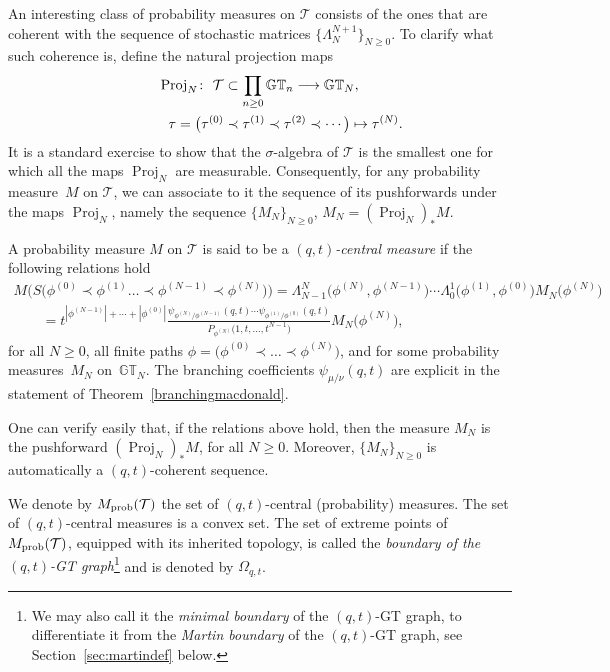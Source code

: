 \documentclass[pdftex]{sigma}
\numberwithin{equation}{section}
\newcommand{\GT}{\mathbb{GT}}
\newcommand{\Tau}{\mathcal{T}}
\begin{document}
An interesting class of probability measures on $\Tau$ consists of the ones that are coherent with the sequence of stochastic matrices $\big\{\Lambda^{N+1}_N\big\}_{N\geq 0}$. To clarify what such coherence is, def\/ine the natural projection maps
\begin{gather*}
\operatorname{Proj}_N\colon \ \Tau \subset \prod_{n\geq 0}{\GT_n} \longrightarrow \GT_N,\\
\hphantom{\operatorname{Proj}_N\colon}{} \ \tau = \big(\tau^{(0)} \prec \tau^{(1)} \prec \tau^{(2)} \prec \cdots\big) \mapsto \tau^{(N)}.
\end{gather*}
It is a standard exercise to show that the $\sigma$-algebra of $\Tau$ is the smallest one for which all the maps $\operatorname{Proj}_N$ are measurable. Consequently, for any probability measure~$M$ on $\Tau$, we can associate to it the sequence of its pushforwards under the maps $\operatorname{Proj}_N$, namely the sequence $\{M_N\}_{N\geq 0}$, $M_N = (\operatorname{Proj}_N )_*M$.

\begin{df}\label{def:qtcentral}
A probability measure $M$ on $\Tau$ is said to be a \textit{$(q, t)$-central measure} if the following relations hold
\begin{gather*}
M\big( S\big(\phi^{(0)} \prec \phi^{(1)}\dots \prec \phi^{(N-1)} \prec \phi^{(N)}\big) \big) =
\Lambda^{N}_{N-1}\big(\phi^{(N)}, \phi^{(N-1)}\big) \cdots \Lambda^{1}_0\big(\phi^{(1)}, \phi^{(0)}\big) M_N\big(\phi^{(N)}\big) \\
\qquad{} = t^{|\phi^{(N-1)}| + \cdots + |\phi^{(0)}|} \frac{\psi_{\phi^{(N)}/\phi^{(N-1)}}(q, t) \cdots \psi_{\phi^{(1)}/\phi^{(0)}}(q, t) }{P_{\phi^{(N)}}\big(1, t, \dots, t^{N-1}\big)} M_N\big(\phi^{(N)}\big),
\end{gather*}
for all $N \geq 0$, all f\/inite paths $\phi = \big(\phi^{(0)} \prec \dots \prec \phi^{(N)}\big)$, and for some probability measures~$M_N$ on~$\GT_N$.
The branching coef\/f\/icients $\psi_{\mu/\nu}(q, t)$ are explicit in the statement of Theorem~\ref{branchingmacdonald}.

One can verify easily that, if the relations above hold, then the measure $M_N$ is the pushforward $( \operatorname{Proj}_N)_* M$, for all $N \geq 0$. Moreover, $\{M_N\}_{N \geq 0}$ is automatically a $(q, t)$-coherent sequence.

We denote by $M_{\rm prob}(\Tau)$ the set of $(q, t)$-central (probability) measures. The set of $(q, t)$-central measures is a convex set. The set of extreme points of $M_{\rm prob}(\Tau)$, equipped with its inherited topology, is called the \textit{boundary of the $(q, t)$-GT graph}\footnote{We may also call it the \textit{minimal boundary} of the $(q, t)$-GT graph, to dif\/ferentiate it from the \textit{Martin boundary} of the $(q, t)$-GT graph, see Section~\ref{sec:martindef} below.} and is denoted by $\Omega_{q, t}$.
\end{df}
\end{document}
